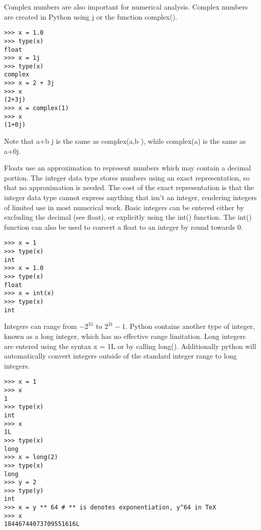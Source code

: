 \documentclass[11pt]{article} %
\begin{document}
Complex numbers are also important for numerical analysis. Complex numbers are created in Python
using j or the function complex().
\begin{framed}
\begin{verbatim}
>>> x = 1.0
>>> type(x)
float
>>> x = 1j
>>> type(x)
complex
>>> x = 2 + 3j
>>> x
(2+3j)
>>> x = complex(1)
>>> x
(1+0j)
\end{verbatim}
\end{framed}
Note that a+b j is the same as complex(a,b ), while complex(a) is the same as a+0j.
\newpage

Floats use an approximation to represent numbers which may contain a decimal portion. The integer data
type stores numbers using an exact representation, so that no approximation is needed. The cost of the
exact representation is that the integer data type cannot express anything that isn’t an integer, rendering
integers of limited use in most numerical work.
Basic integers can be entered either by excluding the decimal (see float), or explicitly using the int()
function. The int() function can also be used to convert a float to an integer by round towards 0.
\begin{framed}
\begin{verbatim}
>>> x = 1
>>> type(x)
int
>>> x = 1.0
>>> type(x)
float
>>> x = int(x)
>>> type(x)
int
\end{verbatim}
\end{framed}
Integers can range from $-2^31$ to $2^31-1$. 
Python contains another type of integer, known as a long
integer, which has no effective range limitation. Long integers are entered using the syntax x = 1L or by
calling long(). Additionally python will automatically convert integers outside of the standard integer
range to long integers.
\begin{framed}
\begin{verbatim}
>>> x = 1
>>> x
1
>>> type(x)
int
>>> x
1L
>>> type(x)
long
>>> x = long(2)
>>> type(x)
long
>>> y = 2
>>> type(y)
int
>>> x = y ** 64 # ** is denotes exponentiation, y^64 in TeX
>>> x
18446744073709551616L
\end{verbatim}
\end{framed}
\end{document}
